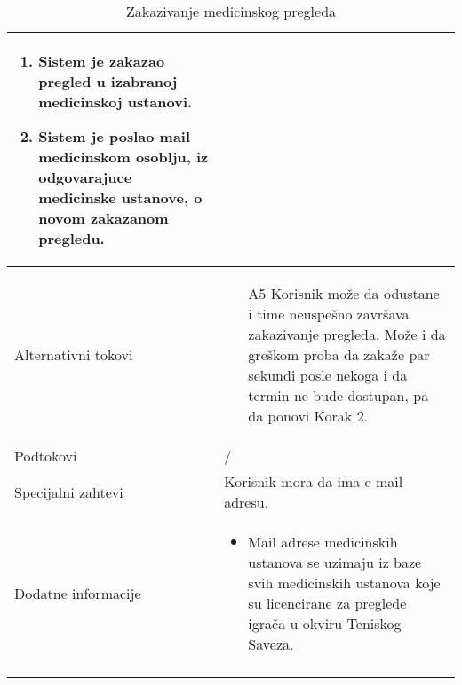 \documentclass{article}
\begin{document}
\begin{longtable}{| p{} | p{} |}
\begin{enumerate}
                    \item Sistem je zakazao pregled u izabranoj medicinskoj ustanovi.
                    \item Sistem je poslao mail medicinskom osoblju, iz odgovarajuce medicinske ustanove, o novom zakazanom pregledu.
                \end{enumerate}\\
            \hline
                Alternativni tokovi & \begin{itemize}
                    \item[A5] Korisnik može da odustane i time neuspešno završava zakazivanje pregleda. Može i da greškom proba da zakaže par sekundi posle nekoga i da termin ne bude dostupan, pa da ponovi Korak 2.
                \end{itemize}\\
            \hline
                Podtokovi & /\\
            \hline
                Specijalni zahtevi & Korisnik mora da ima e-mail adresu.\\
            \hline
                Dodatne informacije & \begin{itemize}
                    \item Mail adrese medicinskih ustanova se uzimaju iz baze svih medicinskih ustanova koje su licencirane za preglede igrača u okviru Teniskog Saveza.
                \end{itemize} \\
            \hline
            \caption{Zakazivanje medicinskog pregleda}
            \end{longtable}       
\end{document}

